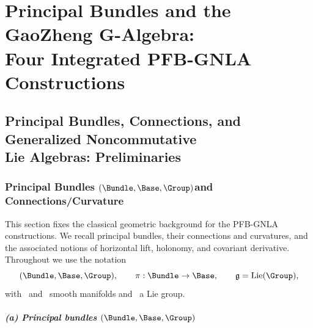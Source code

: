 \documentclass[11pt]{book}
\theoremstyle{plain}
\theoremstyle{definition}
\begin{document}
\part[Principal Bundles and the GaoZheng G-Algebra]{Principal Bundles and the GaoZheng G-Algebra:\\
      Four Integrated PFB-GNLA Constructions}


\chapter[Principal Bundles and GNLA: Preliminaries]{Principal Bundles, Connections, and Generalized Noncommutative\\
         Lie Algebras: Preliminaries}


\section[Principal Bundles and Connections/Curvature]{Principal Bundles \texorpdfstring{$(\Bundle,\Base,\Group)$}{(P,M,G)}and Connections/Curvature}


This section fixes the classical geometric background for the PFB-GNLA
constructions. We recall principal bundles, their connections and
curvatures, and the associated notions of horizontal lift, holonomy,
and covariant derivative. Throughout we use the notation
\[
  (\Bundle,\Base,\Group),\qquad
  \pi:\Bundle\to\Base,\qquad
  \mathfrak{g}=\mathrm{Lie}(\Group),
\]
with \Bundle\ and \Base\ smooth manifolds and \Group\ a Lie group.



\subsubsection*{(a) Principal bundles \texorpdfstring{$(\Bundle,\Base,\Group)$}{(P,M,G)}}
\end{document}
